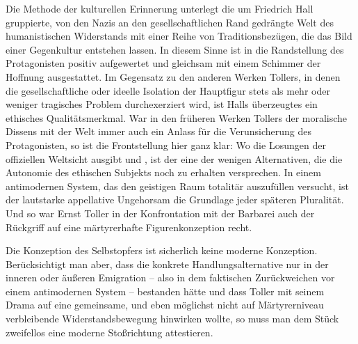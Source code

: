 Die Methode der kulturellen Erinnerung unterlegt die um Friedrich Hall
gruppierte, von den Nazis an den gesellschaftlichen Rand gedrängte Welt des
humanistischen Widerstands mit einer Reihe von Traditionsbezügen, die das
Bild einer  Gegenkultur entstehen lassen. In diesem Sinne
ist in  die Randstellung des Protagonisten positiv
aufgewertet und gleichsam mit einem Schimmer der Hoffnung ausgestattet. Im
Gegensatz zu den anderen Werken Tollers, in denen die gesellschaftliche oder
ideelle Isolation der Hauptfigur stets als mehr oder weniger tragisches Problem
durchexerziert wird, ist Halls überzeugtes 
ein ethisches Qualitätsmerkmal. War in den früheren Werken Tollers der
moralische Dissens mit der Welt immer auch ein Anlass für die Verunsicherung
des Protagonisten,
so ist die Frontstellung hier ganz klar: Wo \Cite{der Vater der Lüge}
 die Losungen der offiziellen Weltsicht ausgibt und
\Cite{der Antichrist regiert} , ist der \Cite{der Weg der
  Wahrheit} eine der wenigen Alternativen, die die Autonomie des ethischen
Subjekts noch zu erhalten versprechen. In einem antimodernen System, das den geistigen Raum
totalitär auszufüllen versucht, ist der lautstarke appellative Ungehorsam die
Grundlage jeder späteren Pluralität. Und so war Ernst Toller in  der
Konfrontation mit der Barbarei auch der Rückgriff auf
eine märtyrerhafte Figurenkonzeption recht. 

Die Konzeption des Selbstopfers ist
sicherlich keine moderne Konzeption. Berücksichtigt man aber, dass die
konkrete
Handlungsalternative nur in der inneren oder äußeren Emigration -- also in dem
faktischen Zurückweichen vor einem antimodernen System -- bestanden hätte und
dass Toller mit seinem Drama auf eine gemeinsame, und eben möglichst nicht auf
Märtyrerniveau verbleibende Widerstandsbewegung hinwirken wollte, so muss
man dem Stück zweifellos eine moderne Stoßrichtung attestieren. 


